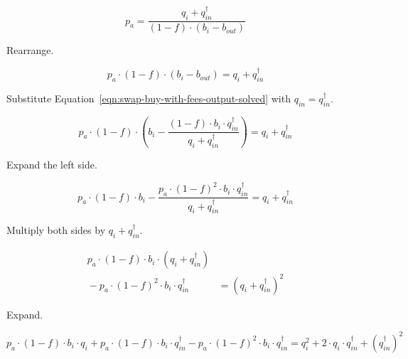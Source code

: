 \documentclass[table, twocolumn]{article}
\begin{document}
\begin{equation}
  p_a = \frac{q_i + q_{in}^{\dagger}}{(1 - f) \cdot (b_i - b_{out})} \nonumber
\end{equation}

Rearrange.

\begin{equation}
  p_a \cdot (1 - f) \cdot (b_i - b_{out}) = q_i + q_{in}^{\dagger} \nonumber
\end{equation}

Substitute Equation~\ref{eqn:swap-buy-with-fees-output-solved} with
$q_{in} = q_{in}^{\dagger}$.

\begin{equation}
  p_a \cdot (1 - f) \cdot
  \left(b_i -
  \frac{(1 - f) \cdot b_i \cdot q_{in}^{\dagger}}{q_i + q_{in}^{\dagger}}
  \right) = q_i + q_{in}^{\dagger} \nonumber
\end{equation}

Expand the left side.

\begin{equation}
  p_a \cdot (1 - f) \cdot b_i -
  \frac{p_a \cdot{(1 - f)}^2 \cdot b_i \cdot q_{in}^{\dagger}}{q_i + q_{in}^{\dagger}} =
  q_i + q_{in}^{\dagger} \nonumber
\end{equation}

Multiply both sides by $q_i + q_{in}^{\dagger}$.

\begin{equation}
  \begin{aligned}
    p_a \cdot (1 - f) \cdot b_i \cdot (q_i + q_{in}^{\dagger}) & \\
    {}- p_a \cdot {(1 - f)}^2 \cdot b_i \cdot q_{in}^{\dagger} &=
    {(q_i + q_{in}^{\dagger})}^2
  \end{aligned}
  \nonumber
\end{equation}

Expand.

\begin{equation}
  p_a \cdot (1 - f) \cdot b_i \cdot q_i +
  p_a \cdot (1 - f) \cdot b_i \cdot q_{in}^{\dagger} -
  p_a \cdot {(1 - f)}^2 \cdot b_i \cdot q_{in}^{\dagger} =
  q_i^2 + 2 \cdot q_i \cdot q_{in}^{\dagger} + {(q_{in}^{\dagger})}^2
  \nonumber
\end{equation}
\end{document}
